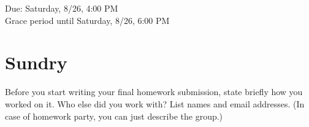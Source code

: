 \documentclass[11pt]{article}
\begin{document}
\maketitle
\fontsize{12}{15}\selectfont

\begin{center}
    Due: Saturday, 8/26, 4:00 PM \\
    Grace period until Saturday, 8/26, 6:00 PM \\
\end{center}

\section*{Sundry}
Before you start writing your final homework submission, state briefly how you worked on it.  Who else did you work with?  List names and email addresses.  (In case of homework party, you can just describe the group.)

\vspace{15pt}

\end{document}
